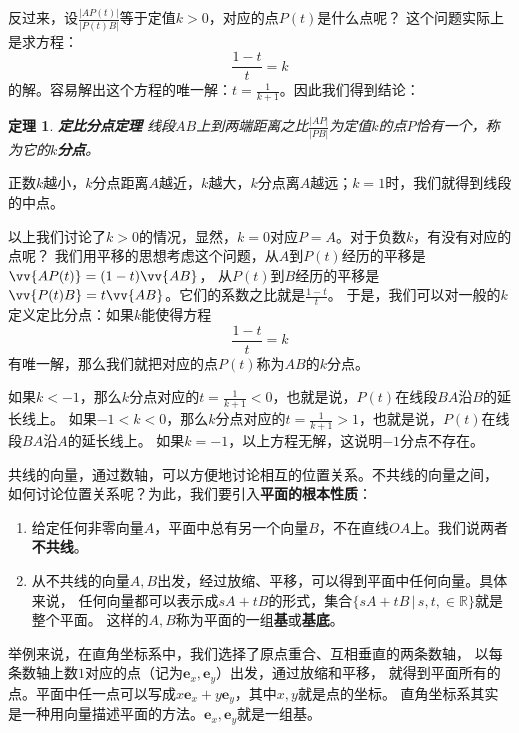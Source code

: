 \documentclass[12pt,UTF8]{ctexbook}
\newtheorem{tm}{定理}[section]
\begin{document}
反过来，设$ \frac{|AP(t)|}{|P(t)B|}$等于定值$k > 0$，对应的点$P(t)$是什么点呢？
这个问题实际上是求方程：
$$ \frac{1 - t}{t} = k$$
的解。容易解出这个方程的唯一解：$t = \frac{1}{k+1}$。因此我们得到结论：
\begin{tm}{\textbf{定比分点定理} }\label{tm:0-0-10}
    线段$AB$上到两端距离之比$\frac{|AP|}{|PB|}$为定值$k$的点$P$恰有一个，称为它的$k$\textbf{分点}。
\end{tm}
正数$k$越小，$k$分点距离$A$越近，$k$越大，$k$分点离$A$越远；$k=1$时，我们就得到线段的中点。

以上我们讨论了$k>0$的情况，显然，$k=0$对应$P = A$。对于负数$k$，有没有对应的点呢？
我们用平移的思想考虑这个问题，从$A$到$P(t)$经历的平移是$\vv{AP(t)} = (1 - t)\vv{AB}$，
从$P(t)$到$B$经历的平移是$\vv{P(t)B} = t\vv{AB}$。它们的系数之比就是$ \frac{1 - t}{t}$。
于是，我们可以对一般的$k$定义定比分点：如果$k$能使得方程
$$ \frac{1 - t}{t} = k$$
有唯一解，那么我们就把对应的点$P(t)$称为$AB$的$k$分点。

如果$k<-1$，那么$k$分点对应的$t = \frac{1}{k+1} < 0$，也就是说，$P(t)$在线段$BA$沿$B$的延长线上。
如果$-1<k<0$，那么$k$分点对应的$t = \frac{1}{k+1} > 1$，也就是说，$P(t)$在线段$BA$沿$A$的延长线上。
如果$k=-1$，以上方程无解，这说明$-1$分点不存在。

共线的向量，通过数轴，可以方便地讨论相互的位置关系。不共线的向量之间，
如何讨论位置关系呢？为此，我们要引入\textbf{平面的根本性质}：
\begin{enumerate}
    \item 给定任何非零向量$A$，平面中总有另一个向量$B$，不在直线$OA$上。我们说两者\textbf{不共线}。
    \item 从不共线的向量$A, B$出发，经过放缩、平移，可以得到平面中任何向量。具体来说，
    任何向量都可以表示成$sA + tB$的形式，集合$\{sA + tB \,|\, s, t, \in\mathbb{R}\}$就是整个平面。
    这样的$A, B$称为平面的一组\textbf{基}或\textbf{基底}。
\end{enumerate}

举例来说，在直角坐标系中，我们选择了原点重合、互相垂直的两条数轴，
以每条数轴上数$1$对应的点（记为$\mathbf{e}_x, \mathbf{e}_y$）出发，通过放缩和平移，
就得到平面所有的点。平面中任一点可以写成$x\mathbf{e}_x + y\mathbf{e}_y$，其中$x,y$就是点的坐标。
直角坐标系其实是一种用向量描述平面的方法。$\mathbf{e}_x, \mathbf{e}_y$就是一组基。
\end{document}
